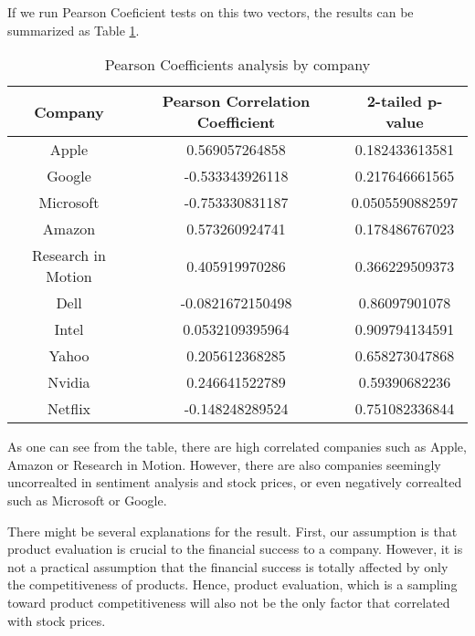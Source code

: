 \documentclass[12pt]{article}
\begin{document}
If we run Pearson Coeficient tests on this two vectors, the results can be summarized as Table \ref{coefficients-by-company}.

\begin{table}
\begin{center}
    \begin{tabular}{ | c || c | c | }
        \hline
        \textbf{Company} & \textbf{Pearson Correlation Coefficient} & \textbf{2-tailed p-value} \\ \hline
        \hline
        Apple & 0.569057264858 & 0.182433613581 \\ \hline
        Google & -0.533343926118 & 0.217646661565 \\ \hline
        Microsoft & -0.753330831187 & 0.0505590882597 \\ \hline
        Amazon & 0.573260924741 & 0.178486767023 \\ \hline
        Research in Motion & 0.405919970286 & 0.366229509373 \\ \hline
        Dell & -0.0821672150498 & 0.86097901078 \\ \hline
        Intel & 0.0532109395964 & 0.909794134591 \\ \hline
        Yahoo & 0.205612368285 & 0.658273047868 \\ \hline
        Nvidia & 0.246641522789 & 0.59390682236 \\ \hline
        Netflix & -0.148248289524 & 0.751082336844 \\ \hline
    \end{tabular}
\caption{Pearson Coefficients analysis by company}
\label{coefficients-by-company}
\end{center}
\end{table}

As one can see from the table, there are high correlated companies such as Apple, Amazon or Research in Motion. However, there are also companies seemingly uncorrealted in sentiment analysis and stock prices, or even negatively correalted such as Microsoft or Google.

There might be several explanations for the result. First, our assumption is that product evaluation is crucial to the financial success to a company. However, it is not a practical assumption that the financial success is totally affected by only the competitiveness of products. Hence, product evaluation, which is a sampling toward product competitiveness will also not be the only factor that correlated with stock prices.
\end{document}
